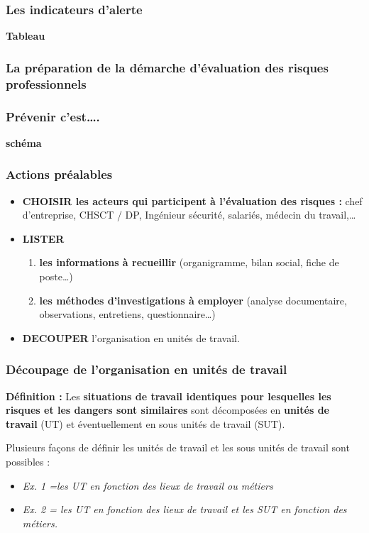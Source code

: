 \documentclass{beamer}
\begin{document}
\begin{frame}
\frametitle{Les indicateurs d’alerte}

\textbf{Tableau}
\end{frame}

\begin{frame}
\frametitle{La préparation de la démarche d’évaluation des risques professionnels}

\end{frame}

\begin{frame}
\frametitle{Prévenir c’est….}

\textbf{schéma}
\end{frame}

\begin{frame}
\frametitle{Actions préalables}
\begin{itemize}
\item \textbf{CHOISIR les acteurs qui participent à l’évaluation des risques :} 
chef d’entreprise, CHSCT / DP, Ingénieur sécurité, salariés, médecin du travail,…
\item \textbf{LISTER}
\begin{enumerate}
\item  \textbf{les informations à recueillir} (organigramme, bilan social, fiche de poste…) 
\item  \textbf{les méthodes d’investigations à employer} (analyse documentaire, observations, entretiens, questionnaire…)
\end{enumerate}
\item \textbf{DECOUPER} l’organisation en unités de travail.
\end{itemize}
\end{frame}

\begin{frame}
\frametitle{Découpage de l’organisation en unités de travail}

\textbf{Définition : }
Les \textbf{situations de travail identiques pour lesquelles les risques et les dangers sont similaires} sont décomposées en \textbf{unités de travail} (UT) et éventuellement en sous unités de travail (SUT).

Plusieurs façons de définir les unités de travail et les sous unités de travail sont possibles :
\begin{itemize}
\item \textit{Ex. 1 =les UT en fonction des lieux de travail ou métiers}
\item \textit{Ex. 2 = les UT en fonction des lieux de travail et les SUT en  fonction des métiers.}
\end{itemize}
\end{frame}
\end{document}

